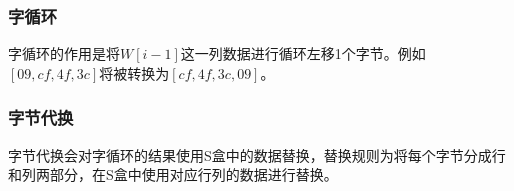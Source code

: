 \vspace{0.5cm}

\subsubsection{字循环}

字循环的作用是将$ W[i-1] $这一列数据进行循环左移1个字节。例如$ [09, cf, 4f, 3c] $将被转换为$ [cf, 4f, 3c, 09] $。\\

\subsubsection{字节代换}

字节代换会对字循环的结果使用S盒中的数据替换，替换规则为将每个字节分成行和列两部分，在S盒中使用对应行列的数据进行替换。\\

